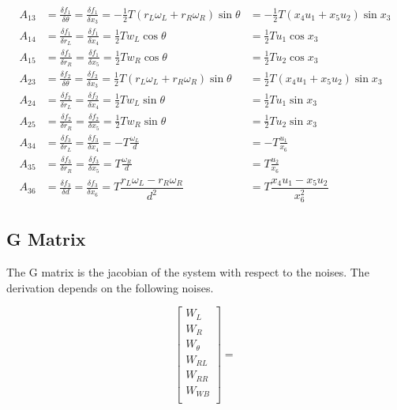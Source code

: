 \documentclass[11pt]{amsart}
\begin{document}
\begin{align}
A_{13} &= \frac{\delta f_1}{\delta\theta} = \frac{\delta f_1}{\delta x_3} = -\frac{1}{2} T (r_L \omega_L + r_R \omega_R) \sin{\theta}  &= -\frac{1}{2} T (x_4 u_1 + x_5 u_2) \sin{x_3} \\
A_{14} &= \frac{\delta f_1}{\delta r_L} = \frac{\delta f_1}{\delta x_4} = \frac{1}{2} T w_L \cos{\theta} &= \frac{1}{2} T u_1 \cos{x_3} \\
A_{15} &= \frac{\delta f_1}{\delta r_R} = \frac{\delta f_1}{\delta x_5} = \frac{1}{2} T w_R \cos{\theta} &= \frac{1}{2} T u_2 \cos{x_3}\\
A_{23} &= \frac{\delta f_2}{\delta\theta} = \frac{\delta f_2}{\delta x_3} = \frac{1}{2} T (r_L \omega_L + r_R \omega_R) \sin{\theta}  &= \frac{1}{2} T (x_4 u_1 + x_5 u_2) \sin{x_3} \\
A_{24} &= \frac{\delta f_2}{\delta r_L} = \frac{\delta f_2}{\delta x_4} = \frac{1}{2} T w_L \sin{\theta} &= \frac{1}{2} T u_1 \sin{x_3} \\
A_{25} &=\frac{\delta f_2}{\delta r_R} = \frac{\delta f_2}{\delta x_5} = \frac{1}{2} T w_R \sin{\theta} &= \frac{1}{2} T u_2 \sin{x_3} \\
A_{34} &=\frac{\delta f_3}{\delta r_L} = \frac{\delta f_3}{\delta x_4} = -T \frac{\omega_L}{d} &= -T \frac{u_1}{x_6}\\
A_{35} &=\frac{\delta f_3}{\delta r_R} = \frac{\delta f_3}{\delta x_5} = T \frac{\omega_R}{d} &= T \frac{u_2}{x_6}\\
A_{36} &=\frac{\delta f_3}{\delta d} = \frac{\delta f_3}{\delta x_6} = T \dfrac{r_L \omega_L - r_R \omega_R}{d^2} &= T \dfrac{x_4 u_1 - x_5 u_2}{x_6^2}
\end{align}

\newpage
\subsection{G Matrix}
The G matrix is the jacobian of the system with respect to the noises.  The derivation depends on the following noises.

\begin{equation}
\begin{bmatrix}
W_L \\ W_R \\ W_{\theta} \\ W_{RL} \\ W_{RR} \\ W_{WB} \\  
\end{bmatrix} = 
\end{equation}
\end{document}
